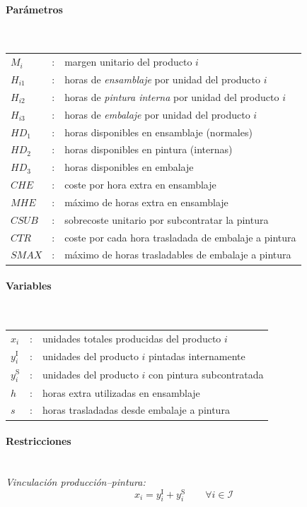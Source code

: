 \paragraph{Parámetros}\mbox{}\\
\begin{tabular}{lcl}
$M_i$     & : & margen unitario del producto $i$ \\
$H_{i1}$  & : & horas de \emph{ensamblaje} por unidad del producto $i$ \\
$H_{i2}$  & : & horas de \emph{pintura interna} por unidad del producto $i$ \\
$H_{i3}$  & : & horas de \emph{embalaje} por unidad del producto $i$ \\
$HD_1$    & : & horas disponibles en ensamblaje (normales) \\
$HD_2$    & : & horas disponibles en pintura (internas) \\
$HD_3$    & : & horas disponibles en embalaje \\
$CHE$     & : & coste por hora extra en ensamblaje \\
$MHE$     & : & máximo de horas extra en ensamblaje \\
$CSUB$    & : & sobrecoste unitario por subcontratar la pintura \\
$CTR$     & : & coste por cada hora trasladada de embalaje a pintura \\
$SMAX$    & : & máximo de horas trasladables de embalaje a pintura \\
\end{tabular}

\paragraph{Variables}\mbox{}\\
\begin{tabular}{lcl}
$x_i$               & : & unidades totales producidas del producto $i$ \\
$y_i^{\mathrm{I}}$  & : & unidades del producto $i$ pintadas internamente \\
$y_i^{\mathrm{S}}$  & : & unidades del producto $i$ con pintura subcontratada \\
$h$                 & : & horas extra utilizadas en ensamblaje \\
$s$                 & : & horas trasladadas desde embalaje a pintura \\
\end{tabular}

\paragraph{Restricciones}\mbox{}\\
\textit{Vinculación producción–pintura:}
\begin{equation}
x_i = y_i^{\mathrm{I}} + y_i^{\mathrm{S}} \qquad \forall i \in \mathcal{I}
\end{equation}

